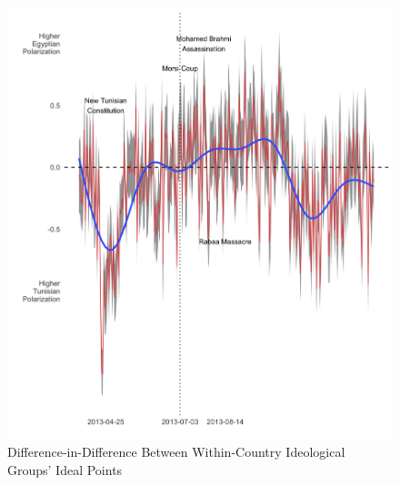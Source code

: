 \documentclass[12pt]{article}
\begin{document}
 \begin{figure}[!h]
	\centering
	\caption{Difference-in-Difference Between Within-Country Ideological Groups' Ideal Points}\label{diffindiff}
	\centering
	\includegraphics[width=.9\linewidth]{diff_ideal}
\end{figure}
\end{document}
